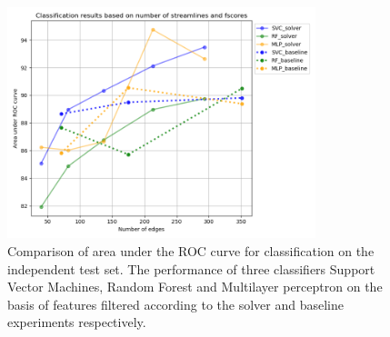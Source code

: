 \documentclass[msthesis.tex]{subfiles}
\begin{document}
\begin{figure}
    \centering
    \includegraphics[width=0.8\textwidth]{images/select_clf_auc_gender.png}
    \caption{Comparison of area under the ROC curve for classification on the independent test set. The performance of three classifiers Support Vector Machines, Random Forest and Multilayer perceptron on the basis of features filtered according to the solver and baseline experiments respectively.}
    \label{fig:clf_solver results}
\end{figure}
\end{document}
